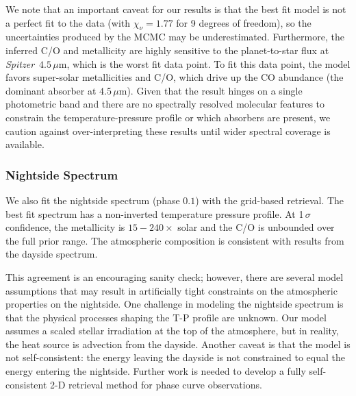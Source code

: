 \documentclass[twocolumn, trackchanges]{aastex61}
\newcommand{\project}[1]{\textsl{#1}}
\newcommand{\Spitzer}{\project{Spitzer}}
\begin{document}
We note that an important caveat for our results is that the best fit model is not a perfect fit to the data (with $\chi_\nu = 1.77$ for 9 degrees of freedom), so the uncertainties produced by the MCMC may be underestimated. Furthermore, the inferred C/O and metallicity are highly sensitive to the planet-to-star flux at \Spitzer\ $4.5\,\mu$m, which is the worst fit data point. To fit this data point, the model favors super-solar metallicities and C/O, which drive up the CO abundance (the dominant absorber at $4.5\,\mu$m). Given that the result hinges on a single photometric band and there are no spectrally resolved molecular features to constrain the temperature-pressure profile or which absorbers are present, we caution against over-interpreting these results until wider spectral coverage is available.


\subsubsection{Nightside Spectrum}
We also fit the nightside spectrum (phase $0.1$) with the grid-based retrieval. The best fit spectrum has a non-inverted temperature pressure profile.  At 1\,$\sigma$ confidence, the metallicity is $15 - 240\times$ solar and the C/O is unbounded over the full prior range. The atmospheric composition is consistent with results from the dayside spectrum. 

This agreement is an encouraging sanity check; however, there are several model assumptions that may result in artificially tight constraints on the atmospheric properties on the nightside.  One challenge in modeling the nightside spectrum is that the physical processes shaping the T-P profile are unknown.  Our model assumes a scaled stellar irradiation at the top of the atmosphere, but in reality, the heat source is advection from the dayside. Another caveat is that the model is not self-consistent: the energy leaving the dayside is not constrained to equal the energy entering the nightside.  Further work is needed to develop a fully self-consistent 2-D retrieval method for phase curve observations. 
\end{document}
